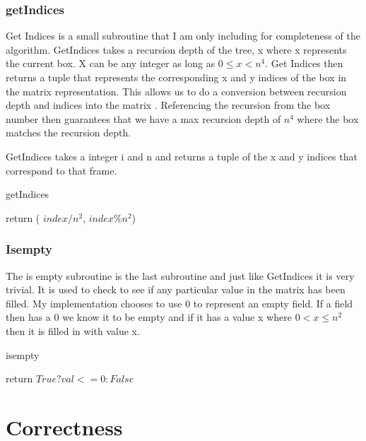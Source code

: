 \documentclass{sig-alternate}
\begin{document}
\subsubsection{getIndices}
Get Indices is a small subroutine that I am only including for completeness of the algorithm. GetIndices takes a recursion depth of the tree, x where x represents the current box. X can be any integer as long as $ 0 \le x < n^4$. Get Indices then returns a tuple that represents the corresponding x and y indices of the box in the matrix representation. This allows us to do a conversion between recursion depth and indices into the matrix . Referencing the recursion from the box number then guarantees that we have a max recursion depth of $n^4$ where the box matches the recursion depth. 

GetIndices takes a integer i and n and returns a tuple of the x and y indices that correspond to that frame.

\begin{algorithm}[H]
\caption{getIndices}\label{getIndecies}
\begin{algorithmic}[1]

\State return ( $index / n^2$, $index \% n^2$)

\EndProcedure
\end{algorithmic}
\end{algorithm}


\subsubsection{Isempty}

The is empty subroutine is the last subroutine and just like GetIndices it is very trivial. It is used to check to see if any particular value in the matrix has been filled. My implementation chooses to use 0 to represent an empty field. If a field then has a 0 we know it to be empty and if it has a value x where $0 < x \le n^2$ then it is filled in with value x. 

\begin{algorithm}[H]
\caption{isempty}\label{isempty}
\begin{algorithmic}[1]
\State return $True ? val <= 0 : False$
\EndProcedure
\end{algorithmic}
\end{algorithm}


\section{Correctness}
\end{document}
